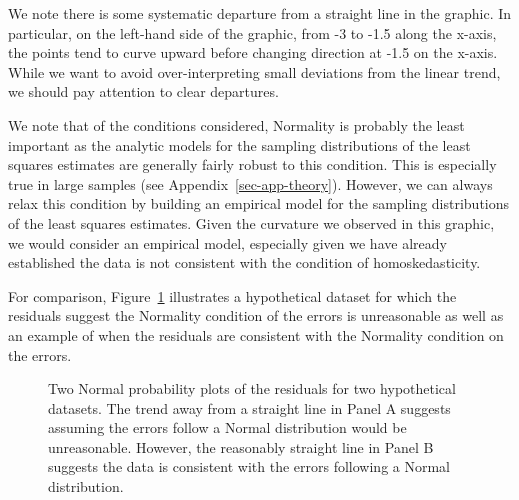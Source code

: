 \documentclass[
  letterpaper,
  DIV=11,
  numbers=noendperiod]{scrreprt}
\theoremstyle{plain}
\theoremstyle{definition}
\theoremstyle{definition}
\theoremstyle{remark}
\begin{document}
We note there is some systematic departure from a straight line in the
graphic. In particular, on the left-hand side of the graphic, from -3 to
-1.5 along the x-axis, the points tend to curve upward before changing
direction at -1.5 on the x-axis. While we want to avoid
over-interpreting small deviations from the linear trend, we should pay
attention to clear departures.

We note that of the conditions considered, Normality is probably the
least important as the analytic models for the sampling distributions of
the least squares estimates are generally fairly robust to this
condition. This is especially true in large samples (see
Appendix~\ref{sec-app-theory}). However, we can always relax this
condition by building an empirical model for the sampling distributions
of the least squares estimates. Given the curvature we observed in this
graphic, we would consider an empirical model, especially given we have
already established the data is not consistent with the condition of
homoskedasticity.

For comparison, Figure~\ref{fig-regassessment-normal-comparison}
illustrates a hypothetical dataset for which the residuals suggest the
Normality condition of the errors is unreasonable as well as an example
of when the residuals are consistent with the Normality condition on the
errors.

\begin{figure}


\caption{\label{fig-regassessment-normal-comparison}Two Normal
probability plots of the residuals for two hypothetical datasets. The
trend away from a straight line in Panel A suggests assuming the errors
follow a Normal distribution would be unreasonable. However, the
reasonably straight line in Panel B suggests the data is consistent with
the errors following a Normal distribution.}

\end{figure}%
\end{document}
